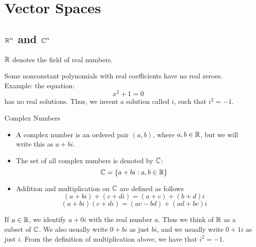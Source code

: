 
\section{Vector Spaces}

\subsection{$\operatorname{\mathbb{R}}^n$ and $\operatorname{\mathbb{C}}^n$}

\begin{definition}
    $\operatorname{\mathbb{R}}$ denotes the field of real numbers.
\end{definition}
    
Some nonconstant polynomials with real coefficients have no real zeroes.
Example: the equation:
\[ x^2 + 1 = 0\]
has no real solutions. Thus, we invent a solution
called $i$, such that $i^2 = -1$.

\begin{definition} Complex Numbers
    \begin{itemize}
        \item A complex number is an ordered pair $(a, b)$, where $a, b \in \operatorname{\mathbb{R}}$, but we will write this as $a+bi$.
        \item The set of all complex numbers is denoted by $\operatorname{\mathbb{C}}$:
            \[ \operatorname{\mathbb{C}} = \{a+bi : a, b \in \operatorname{\mathbb{R}}\} \]
        \item Addition and multiplication on $\operatorname{\mathbb{C}}$ are defined as follows
        \[ (a+bi) + (c+di) = (a+c)+(b+d)i \]
        \[ (a+bi)(c+di) = (ac-bd) + (ad+bc)i \]
    \end{itemize}
\end{definition}

\begin{note}
    If $a \in \operatorname{\mathbb{R}}$, we identify $a+0i$ with the real number $a$.
    Thus we think of $\operatorname{\mathbb{R}}$ as a subset of $\operatorname{\mathbb{C}}$. We also usually write
    $0+bi$ as just $bi$, and we usually write $0+1i$ as just $i$. From
    the definition of multiplication above, we have that $i^2 = -1$.
\end{note}

